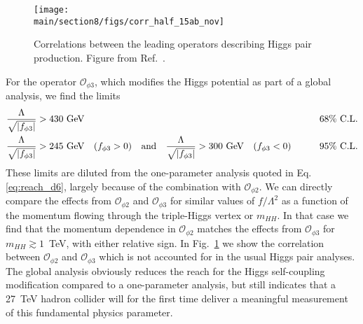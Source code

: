 \begin{figure}[t!]
\centering
\texttt{[image: \\main/section8/figs/corr\_half\_15ab\_nov]}
\caption{Correlations between the leading operators describing Higgs
  pair production. Figure from Ref.~\cite{Biekotter:2018jzu}.}
\label{fig:corr}
\end{figure}
For the operator $\mathcal{O}_{\phi 3}$, which modifies the Higgs potential
as part of a global analysis, we find the limits
%
\begin{alignat}{9}
\frac{\Lambda}{\sqrt{|f_{\phi 3}|}} &> 430~\text{GeV}
&\qquad \text{68\% C.L.} \notag \\
\frac{\Lambda}{\sqrt{|f_{\phi 3}|}} &> 245~\text{GeV}
\quad (f_{\phi 3} >0)
\quad \text{and} \quad 
\frac{\Lambda}{\sqrt{|f_{\phi 3}|}} > 300~\text{GeV}
\quad (f_{\phi 3} <0) 
&\qquad \text{95\% C.L.} 
\label{eq:reach_d6_3}
\end{alignat}
%
These limits are diluted from the one-parameter analysis quoted in
Eq.\eqref{eq:reach_d6}, largely because of the combination with
$\mathcal{O}_{\phi 2}$. We can directly compare the
effects from $\mathcal{O}_{\phi 2}$ and $\mathcal{O}_{\phi 3}$ for similar values of
$f/\Lambda^2$ as a function of the momentum flowing through the
triple-Higgs vertex or $m_{HH}$. In that case we find that the
momentum dependence in $\mathcal{O}_{\phi 2}$ matches the effects from
$\mathcal{O}_{\phi 3}$ for $m_{HH} \gtrsim 1$~TeV, with either relative
sign. 
In Fig.~\ref{fig:corr} we show 
the correlation between $\mathcal{O}_{\phi 2}$ and $\mathcal{O}_{\phi 3}$
which is not
accounted for in the usual Higgs pair analyses.
The global analysis obviously
reduces the reach for the Higgs self-coupling modification compared to
a one-parameter analysis, but still indicates that a 27~TeV hadron
collider will for the first time deliver a meaningful measurement of
this fundamental physics parameter. 


